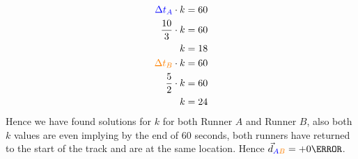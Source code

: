 \documentclass[12pt]{article} %
\begin{document}
\begin{qstn}[11]
\begin{soln}
	\begin{align*}
		\textcolor{blue}{\Delta t_A}\cdot k &= 60\\
		\frac{10}{3}\cdot k &= 60\\
		k &= 18\\
		\textcolor{orange}{\Delta t_B} \cdot k &= 60\\
		\frac{5}{2}\cdot k &= 60\\
		k &= 24
	\end{align*}
	Hence we have found solutions for $k$ for both Runner $A$ and Runner $B$, also both $k$ values are even implying by the end of $60$ seconds, both runners have returned to the start of the track and are at the same location. Hence $\vec d_{\textcolor{blue}{A}\textcolor{orange}{B}} = +0\m$.  

\end{soln}

\end{qstn}
\end{document}
